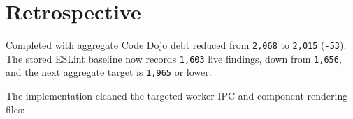 \section{Retrospective}\label{record-218-retrospective}

Completed with aggregate Code Dojo debt reduced from \texttt{2\allowbreak{},\allowbreak{}0\allowbreak{}6\allowbreak{}8} to \texttt{2\allowbreak{},\allowbreak{}0\allowbreak{}1\allowbreak{}5} (\texttt{-\allowbreak{}5\allowbreak{}3}). The stored ESLint baseline now records \texttt{1\allowbreak{},\allowbreak{}6\allowbreak{}0\allowbreak{}3} live findings, down from \texttt{1\allowbreak{},\allowbreak{}6\allowbreak{}5\allowbreak{}6}, and the next aggregate target is \texttt{1\allowbreak{},\allowbreak{}9\allowbreak{}6\allowbreak{}5} or lower.

The implementation cleaned the targeted worker IPC and component rendering files:


